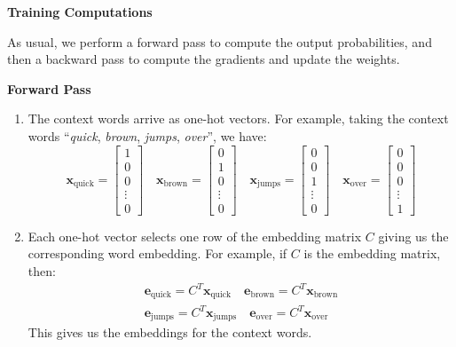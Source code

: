 \highspace
\begin{flushleft}
    \textcolor{Green3}{ \textbf{Training Computations}}
\end{flushleft}
As usual, we perform a forward pass to compute the output probabilities, and then a backward pass to compute the gradients and update the weights.

\highspace
\textcolor{Green3}{} \textcolor{Green3}{\textbf{Forward Pass}}
\begin{enumerate}
    \item {} The context words arrive as one-hot vectors. For example, taking the context words ``\emph{quick}, \emph{brown}, \emph{jumps}, \emph{over}'', we have:
    \begin{equation*}
        \mathbf{x}_{\text{quick}} = \begin{bmatrix} 1 \\ 0 \\ 0 \\ \vdots \\ 0 \end{bmatrix} \quad
        \mathbf{x}_{\text{brown}} = \begin{bmatrix} 0 \\ 1 \\ 0 \\ \vdots \\ 0 \end{bmatrix} \quad
        \mathbf{x}_{\text{jumps}} = \begin{bmatrix} 0 \\ 0 \\ 1 \\ \vdots \\ 0 \end{bmatrix} \quad
        \mathbf{x}_{\text{over}}  = \begin{bmatrix} 0 \\ 0 \\ 0 \\ \vdots \\ 1 \end{bmatrix}
    \end{equation*}


    \item {} Each one-hot vector selects one row of the embedding matrix $C$ giving us the corresponding word embedding. For example, if $C$ is the embedding matrix, then:
    \begin{gather*}
        \mathbf{e}_{\text{quick}} = C^T \mathbf{x}_{\text{quick}} \quad
        \mathbf{e}_{\text{brown}} = C^T \mathbf{x}_{\text{brown}} \\
        \mathbf{e}_{\text{jumps}} = C^T \mathbf{x}_{\text{jumps}} \quad
        \mathbf{e}_{\text{over}}  = C^T \mathbf{x}_{\text{over}}
    \end{gather*}
    This gives us the embeddings for the context words.



\end{enumerate}
